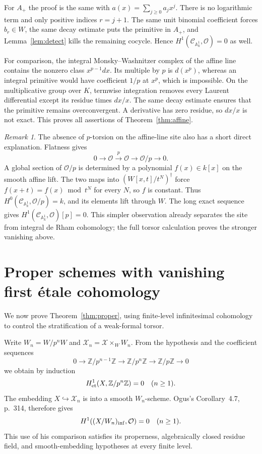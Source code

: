 \documentclass[11pt]{article}
\newcommand{\OO}{\mathcal O}\newcommand{\CC}{\mathcal C}
\newcommand{\A}{\mathbb A}\newcommand{\Gm}{\mathbb G_m}
\theoremstyle{definition}\newtheorem{definition}[theorem]{Definition}
\theoremstyle{remark}\newtheorem{remark}[theorem]{Remark}
\begin{document}
For $A_+$ the proof is the same with $a(x)=\sum_{j\geq0}a_jx^j$. There is no logarithmic term and only positive indices $r=j+1$. The same unit binomial coefficient forces $b_r\in W$, the same decay estimate puts the primitive in $A_+$, and Lemma~\ref{lem:detect} kills the remaining cocycle. Hence $H^1(\CC_{\A^1_k},\OO)=0$ as well.

For comparison, the integral Monsky--Washnitzer complex of the affine line contains the nonzero class $x^{p-1}dx$. Its multiple by $p$ is $d(x^p)$, whereas an integral primitive would have coefficient $1/p$ at $x^p$, which is impossible. On the multiplicative group over $K$, termwise integration removes every Laurent differential except its residue times $dx/x$. The same decay estimate ensures that the primitive remains overconvergent. A derivative has zero residue, so $dx/x$ is not exact. This proves all assertions of Theorem~\ref{thm:affine}.

\begin{remark}\label{rem:torsion}
The absence of $p$-torsion on the affine-line site also has a short direct explanation. Flatness gives
\[
 0\longrightarrow\OO\xrightarrow{p}\OO
     \longrightarrow\OO/p\longrightarrow0.
\]
A global section of $\OO/p$ is determined by a polynomial $f(x)\in k[x]$ on the smooth affine lift. The two maps into $(W[x,t]/t^N)^\dagger$ force $f(x+t)=f(x)\bmod t^N$ for every $N$, so $f$ is constant. Thus $H^0(\CC_{\A^1_k},\OO/p)=k$, and its elements lift through $W$. The long exact sequence gives $H^1(\CC_{\A^1_k},\OO)[p]=0$. This simpler observation already separates the site from integral de Rham cohomology; the full torsor calculation proves the stronger vanishing above.
\end{remark}

\section{Proper schemes with vanishing first \'etale cohomology}

We now prove Theorem~\ref{thm:proper}, using finite-level infinitesimal cohomology to control the stratification of a weak-formal torsor.

Write $W_n=W/p^nW$ and $\mathcal X_n=\mathcal X\times_WW_n$. From the hypothesis and the coefficient sequences
\[
 0\longrightarrow\mathbb Z/p^{n-1}\mathbb Z
 \longrightarrow\mathbb Z/p^n\mathbb Z
 \longrightarrow\mathbb Z/p\mathbb Z\longrightarrow0
\]
we obtain by induction
\[
 H^1_{\mathrm{et}}(X,\mathbb Z/p^n\mathbb Z)=0\quad(n\geq1).
\]
The embedding $X\hookrightarrow\mathcal X_n$ is into a smooth $W_n$-scheme. Ogus's Corollary~4.7, p.~314, therefore gives
\begin{equation}\label{eq:infzero}
 H^1((X/W_n)_{\rm inf},\OO)=0\quad(n\geq1).
\end{equation}
This use of his comparison satisfies its properness, algebraically closed residue field, and smooth-embedding hypotheses at every finite level.
\end{document}
